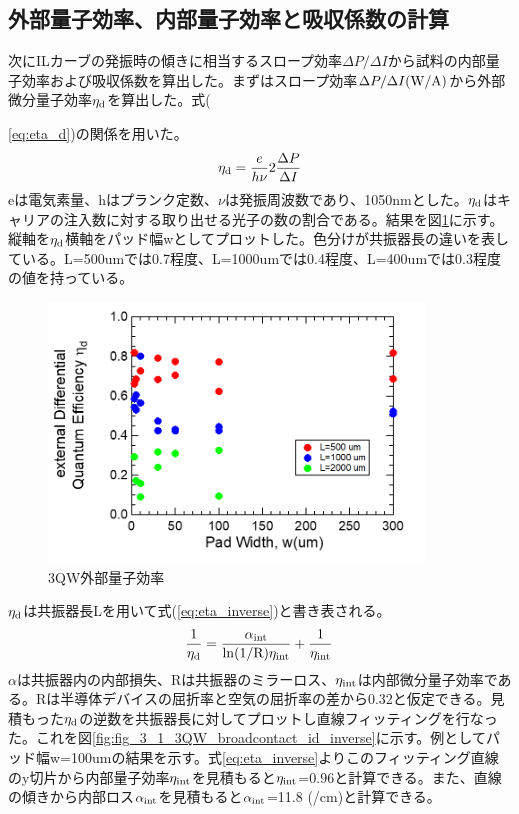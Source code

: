 \subsection{外部量子効率、内部量子効率と吸収係数の計算}%
次にILカーブの発振時の傾きに相当するスロープ効率$\Delta P/\Delta I$から試料の内部量子効率および吸収係数を算出した。まずはスロープ効率$\Delta P/\Delta I \rm{(W/A)}$から外部微分量子効率$\eta_{\rm{d}}$を算出した。式({\ref{eq:eta_d})の関係を用いた。
\begin{eqnarray}
\eta_{\rm{d}}=\dfrac{e}{h\nu}2\dfrac{\Delta P}{\Delta I} 
\label{eq:eta_d}
\end{eqnarray}
eは電気素量、hはプランク定数、$\nu$は発振周波数であり、1050nmとした。$\eta_{\rm{d}}$はキャリアの注入数に対する取り出せる光子の数の割合である。結果を図\ref{fig:fig_3_1_3QW_broadcontact_id}に示す。縦軸を$\eta_{\rm{d}}$横軸をパッド幅wとしてプロットした。色分けが共振器長の違いを表している。L=500umでは0.7程度、L=1000umでは0.4程度、L=400umでは0.3程度の値を持っている。
\begin{figure}[h]
	\centering
	\includegraphics[width=10cm]{figure/fig_3_1_3QW_broadcontact_id.png}
	\caption{3QW外部量子効率}
	\label{fig:fig_3_1_3QW_broadcontact_id}
\end{figure}
$\eta_{\rm{d}}$は共振器長Lを用いて式(\ref{eq:eta_inverse})と書き表される。
\begin{eqnarray}
\dfrac{1}{\eta_{\rm{d}}}=\dfrac{\alpha_{\rm{int}}}{\rm{ln}(1/R)\eta_{int}}+\dfrac{1}{\eta_{\rm{int}}}
\label{eq:eta_inverse}
\end{eqnarray}
$\alpha$は共振器内の内部損失、Rは共振器のミラーロス、$\eta_{\rm{int}}$は内部微分量子効率である。Rは半導体デバイスの屈折率と空気の屈折率の差から0.32と仮定できる。見積もった$\eta_{\rm{d}}$の逆数を共振器長に対してプロットし直線フィッティングを行なった。これを図\ref{fig:fig_3_1_3QW_broadcontact_id_inverse}に示す。例としてパッド幅w=100umの結果を示す。式\ref{eq:eta_inverse}よりこのフィッティング直線のy切片から内部量子効率$\eta_{\rm{int}}$を見積もると$\eta_{\rm{int}}$=0.96と計算できる。また、直線の傾きから内部ロス$\alpha_{\rm{int}}$を見積もると$\alpha_{\rm{int}}$=11.8 (/cm)と計算できる。
}
